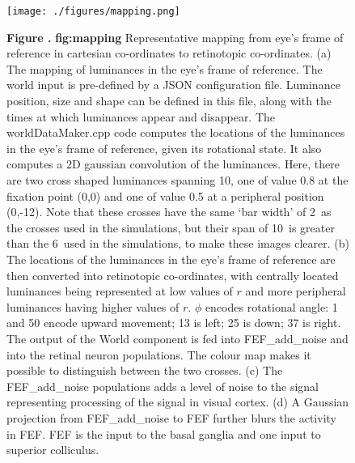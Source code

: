\documentclass{frontiersSCNS}
\begin{document}
\begin{figure}[htb!]
\begin{center}
\texttt{[image: ./figures/mapping.png]}
\end{center}
\textbf{\label{fig:mapping} Figure .}
{ \textbf{fig:mapping} Representative mapping from eye's frame of
reference in cartesian co-ordinates to retinotopic co-ordinates. (a) The
mapping of luminances in the eye's frame of reference. The world input
is pre-defined by a JSON configuration file. Luminance position, size
and shape can be defined in this file, along with the times at which
luminances appear and disappear. The worldDataMaker.cpp code computes
the locations of the luminances in the eye's frame of reference, given
its rotational state. It also computes a 2D gaussian convolution of
the luminances. Here, there are two cross shaped luminances spanning
10\dg, one of value 0.8 at the fixation point (0,0) and one of
value 0.5 at a peripheral position (0,-12\dg). Note that these
crosses have the same `bar width' of 2\dg~as the crosses
used in the simulations, but their span of 10\dg~is greater
than the 6\dg~used in the simulations, to make these
images clearer. (b) The locations of
the luminances in the eye's frame of reference are then converted into
retinotopic co-ordinates, with centrally located luminances being
represented at low values of $r$ and more peripheral luminances having
higher values of $r$. $\phi$ encodes rotational angle: 1 and 50 encode
upward movement; 13 is left; 25 is down; 37 is right. The output of
the World component is fed into FEF\_add\_noise and into the retinal
neuron populations. The colour map makes it possible to distinguish
between the two crosses. (c) The FEF\_add\_noise populations adds a level
of noise to the signal representing processing of the signal in visual
cortex. (d) A Gaussian projection from FEF\_add\_noise to FEF further
blurs the activity in FEF. FEF is the input to the basal ganglia and
one input to superior colliculus.}
\end{figure}
\end{document}
